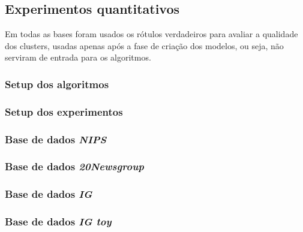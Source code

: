 \documentclass[
    12pt,                %
    oneside,            %
    a4paper,            %
    english,            %
    brazil                %
    ]{abntex2ppgsi}
\begin{document}

\subsection{Experimentos quantitativos}
\label{subsec:experiments-quant}

Em todas as bases foram usados os rótulos verdadeiros para avaliar a qualidade dos clusters, usadas apenas após a fase de criação dos modelos, ou seja, não serviram de entrada para os algoritmos.

\subsubsection{Setup dos algoritmos}


\subsubsection{Setup dos experimentos}

\subsubsection{Base de dados \textit{\textbf{NIPS}}}

\subsubsection{Base de dados \textit{\textbf{20Newsgroup}}}

\subsubsection{Base de dados \textit{\textbf{IG}}}
\label{subsec:experiments-quant:ig}

\subsubsection{Base de dados \textit{\textbf{IG toy}}}
\label{subsec:experiments-quant:igtoy}
\end{document}
